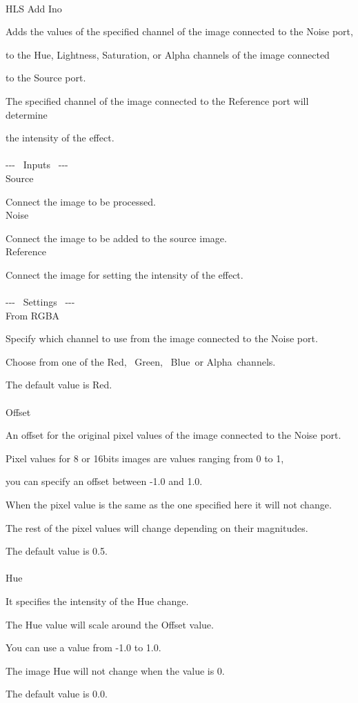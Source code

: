 \documentclass[a4paper,12pt]{article}
\begin{document}
\thispagestyle{empty}

\Large
\noindent \\
HLS Add Ino\medskip
\par
\normalsize
Adds the values of the specified channel of the image connected to the Noise port,\par 
to the Hue, Lightness, Saturation, or Alpha channels of the image connected\par
to the Source port.\\
\par
The specified channel of the image connected to the Reference port will determine\par
the intensity of the effect.\\
\\
-{-}- \ Inputs \ -{-}-\\
Source\par
Connect the image to be processed.\\
Noise\par
Connect the image to be added to the source image.\\
Reference\par
Connect the image for setting the intensity of the effect.\\
\\
-{-}- \ Settings \ -{-}-\\
From RGBA\par
Specify which channel to use from the image connected to the Noise port.\par
Choose from one of the \textquotedbl Red\textquotedbl, \ \textquotedbl Green\textquotedbl, \ \textquotedbl Blue\textquotedbl  \ or \textquotedbl Alpha\textquotedbl \ channels.\par
The default value is \textquotedbl Red\textquotedbl .\\
\\
Offset\par
An offset for the original pixel values of the image connected to the Noise port.\par
Pixel values for 8 or 16bits images are values ranging from 0 to 1,\par
you can specify an offset between -1.0 and 1.0.\par
When the pixel value is the same as the one specified here it will not change.\par
The rest of the pixel values will change depending on their magnitudes.\par
The default value is 0.5.\\
\\
Hue\par
It specifies the intensity of the Hue change.\par
The Hue value will scale around the Offset value.\par
You can use a value from -1.0 to 1.0.\par
The image Hue will not change when the value is 0.\par
The default value is 0.0.\\
\newpage
\end{document}
